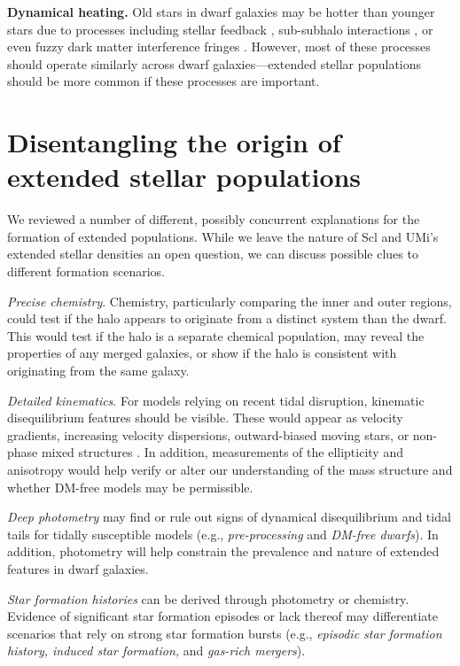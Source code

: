 \textbf{Dynamical heating.} Old stars in dwarf galaxies may be hotter
than younger stars due to processes including stellar feedback
\citep{stinson+2009, maxwell+2012, el-badry+2016, mercado+2021},
sub-subhalo interactions \citep{penarrubia+2025}, or even fuzzy dark
matter interference fringes
\citep[e.g.,][]{el-zant+2020, duttachowdhury+2023}. However, most of
these processes should operate similarly across dwarf
galaxies---extended stellar populations should be more common if these
processes are important.

\section{Disentangling the origin of extended stellar
populations}\label{disentangling-the-origin-of-extended-stellar-populations}

We reviewed a number of different, possibly concurrent explanations for
the formation of extended populations. While we leave the nature of Scl
and UMi's extended stellar densities an open question, we can discuss
possible clues to different formation scenarios.

\emph{Precise chemistry}. Chemistry, particularly comparing the inner
and outer regions, could test if the halo appears to originate from a
distinct system than the dwarf. This would test if the halo is a
separate chemical population, may reveal the properties of any merged
galaxies, or show if the halo is consistent with originating from the
same galaxy.

\emph{Detailed kinematics}. For models relying on recent tidal
disruption, kinematic disequilibrium features should be visible. These
would appear as velocity gradients, increasing velocity dispersions,
outward-biased moving stars, or non-phase mixed structures
\citep[e.g,][]{kroupa1997, read+2006, sanchez-salcedo+hernandez2007}. In
addition, measurements of the ellipticity and anisotropy would help
verify or alter our understanding of the mass structure and whether
DM-free models may be permissible.

\emph{Deep photometry} may find or rule out signs of dynamical
disequilibrium and tidal tails for tidally susceptible models (e.g.,
\emph{pre-processing} and \emph{DM-free dwarfs}). In addition,
photometry will help constrain the prevalence and nature of extended
features in dwarf galaxies.

\emph{Star formation histories} can be derived through photometry or
chemistry. Evidence of significant star formation episodes or lack
thereof may differentiate scenarios that rely on strong star formation
bursts (e.g., \emph{episodic star formation history, induced star
formation,} and \emph{gas-rich mergers}).

